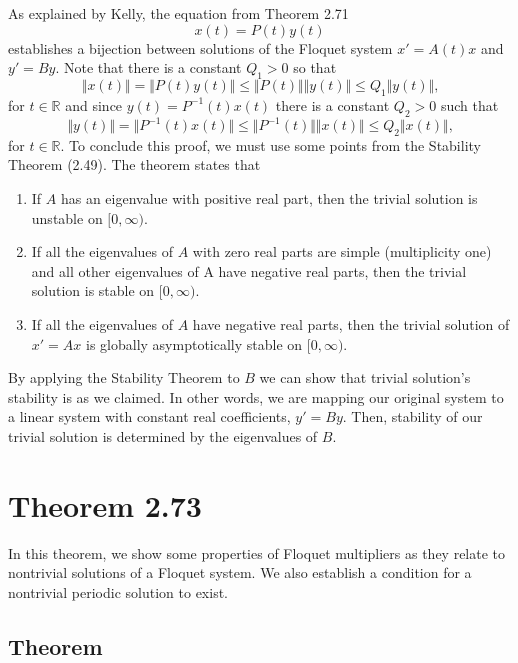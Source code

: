 \documentclass[a4paper]{article}
\begin{document}
As explained by Kelly, the equation from Theorem 2.71 
\begin{equation*}
    x(t) = P(t)y(t)
\end{equation*}
establishes a bijection between solutions of the Floquet system $x' = A(t)x$ and $y' = By$. Note that there is a constant $Q_1 > 0$ so that 
\begin{equation*}
    \Vert x(t) \Vert = \Vert P(t)y(t) \Vert \leq \Vert P(t) \Vert \Vert y(t) \Vert  \leq Q_{1} \Vert y(t) \Vert \text{,}
\end{equation*}
for $t \in \mathbb{R}$ and since $y(t) = P^{-1}(t)x(t)$ there is a constant $Q_2 > 0$ such that 
\begin{equation*}
    \Vert y(t) \Vert = \Vert P^{-1}(t)x(t) \Vert \leq \Vert P^{-1}(t) \Vert \Vert x(t) \Vert  \leq Q_{2} \Vert x(t) \Vert \text{,}
\end{equation*}
for $t \in \mathbb{R}$. To conclude this proof, we must use some points from the Stability Theorem (2.49). The theorem states that \begin{enumerate}
    \item If $A$ has an eigenvalue with positive real part, then the trivial solution is unstable on $[0,\infty)$.
    \item If all the eigenvalues of $A$ with zero real parts are simple (multiplicity one) and all other eigenvalues of A have negative real parts, then the trivial solution is stable on $[0,\infty)$.
    \item If all the eigenvalues of $A$ have negative real parts, then the trivial solution of $x' = Ax$ is globally asymptotically stable on $[0,\infty)$.
\end{enumerate}

By applying the Stability Theorem to $B$ we can show that trivial solution's stability is as we claimed. In other words, we are mapping our original system to a linear system with constant real coefficients, $y' = B y$. Then, stability of our trivial solution is determined by the eigenvalues of $B$.

\section{Theorem 2.73}

In this theorem, we show some properties of Floquet multipliers as they relate to nontrivial solutions of a Floquet system. We also establish a condition for a nontrivial periodic solution to exist.

\subsection{Theorem}
\end{document}
